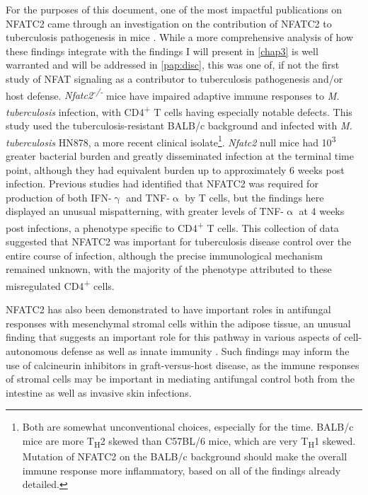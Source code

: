 For the purposes of this document, one of the most impactful publications on NFATC2 came through an investigation on the contribution of NFATC2 to tuberculosis pathogenesis in mice \citep{Via2012}. While a more comprehensive analysis of how these findings integrate with the findings I will present in \autoref{chap3} is well warranted and will be addressed in \autoref{pap:disc}, this was one of, if not the first study of NFAT signaling as a contributor to tuberculosis pathogenesis and/or host defense. \textit{Nfatc2\textsuperscript{\hyp{}/\hyp{}}} mice have impaired adaptive immune responses to \textit{M. tuberculosis} infection, with CD4\textsuperscript{+} T cells having especially notable defects. This study used the tuberculosis\hyp{}resistant BALB/c background and infected with \textit{M. tuberculosis} HN878, a more recent clinical isolate\footnote{Both are somewhat unconventional choices, especially for the time. BALB/c mice are more T\textsubscript{H}2 skewed than C57BL/6 mice, which are very T\textsubscript{H}1 skewed. Mutation of NFATC2 on the BALB/c background should make the overall immune response more inflammatory, based on all of the findings already detailed.}. \textit{Nfatc2} null mice had 10\textsuperscript{3} greater bacterial burden and greatly disseminated infection at the terminal time point, although they had equivalent burden up to approximately 6 weeks post infection. Previous studies had identified that NFATC2 was required for production of both IFN\hyp{}$\upgamma$ and TNF\hyp{}$\upalpha$ by T cells, but the findings here displayed an unusual mispatterning, with greater levels of TNF\hyp{}$\upalpha$ at 4 weeks post infections, a phenotype specific to CD4\textsuperscript{+} T cells. This collection of data suggested that NFATC2 was important for tuberculosis disease control over the entire course of infection, although the precise immunological mechanism remained unknown, with the majority of the phenotype attributed to these misregulated CD4\textsuperscript{+} cells. 

NFATC2 has also been demonstrated to have important roles in antifungal responses with mesenchymal stromal cells within the adipose tissue, an unusual finding that suggests an important role for this pathway in various aspects of cell\hyp{}autonomous defense as well as innate immunity \citep{Tidu2021}. Such findings may inform the use of calcineurin inhibitors in graft\hyp{}versus\hyp{}host disease, as the immune responses of stromal cells may be important in mediating antifungal control both from the intestine as well as invasive skin infections. 

